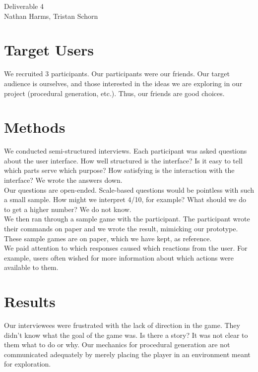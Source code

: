 \documentclass{article}
\begin{document}
\begin{center}
Deliverable 4\\
Nathan Harms, Tristan Schorn
\end{center}

\section{Target Users}

We recruited 3 participants. Our participants were our friends. Our target
audience is ourselves, and those interested in the ideas we are exploring in our
project (procedural generation, etc.). Thus, our friends are good choices.\\

\section{Methods}

We conducted semi-structured interviews. Each participant was asked questions
about the user interface. How well structured is the interface? Is it easy to
tell which parts serve which purpose? How satisfying is the interaction with the
interface? We wrote the answers down.\\

Our questions are open-ended. Scale-based questions would be pointless with such
a small sample. How might we interpret 4/10, for example? What
should we do to get a higher number? We do not know.\\

We then ran through a sample game with the participant. The participant wrote
their commands on paper and we wrote the result, mimicking our prototype. These
sample games are on paper, which we have kept, as reference.\\

We paid attention to which responses caused which reactions from the user. For
example, users often wished for more information about which actions were
available to them.\\

\section{Results}

Our interviewees were frustrated with the lack of direction in the game. They
didn't know what the goal of the game was. Is there a story? It was not clear to
them what to do or why. Our mechanics for procedural generation are not
communicated adequately by merely placing the player in an environment meant for
exploration.\\
\end{document}
